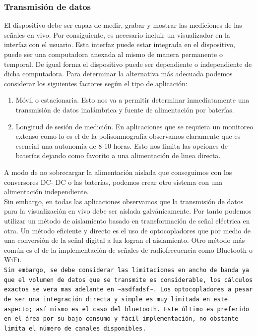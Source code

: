 \subsubsection{Transmisión de datos}
\label{sec:org6bb3188}
El dispositivo debe ser capaz de medir, grabar y mostrar las mediciones de las señales en vivo. Por consiguiente, es necesario incluir un visualizador en la interfaz con el usuario. Esta interfaz puede estar integrada en el dispositivo, puede ser una computadora anexada al mismo de manera permanente o temporal. De igual forma el dispositivo puede ser dependiente o independiente de dicha computadora. Para determinar la alternativa más adecuada podemos considerar los siguientes factores según el tipo de aplicación:\\

\begin{enumerate}
\item Móvil o estacionaria. Esto nos va a permitir determinar inmediatamente una transmisión de datos inalámbrica y fuente de alimentación por baterías.\\
\item Longitud de sesión de medición. En aplicaciones que se requiera un monitoreo extenso como lo es el de la polisomnografía observamos claramente que es esencial una autonomía de 8-10 horas. Esto nos limita las opciones de baterías dejando como favorito a una alimentación de linea directa.\\
\end{enumerate}

A modo de no sobrecargar la alimentación aislada que conseguimos con los conversores DC- DC o las baterías, podemos crear otro sistema con una alimentación independiente.\\

Sin embargo, en todas las aplicaciones observamos que la transmisión de datos para la visualización en vivo debe ser aislada galvánicamente. Por tanto podemos utilizar un método de aislamiento basado en transformación de señal eléctrica en otra. Un método eficiente y directo es el uso de optocopladores que por medio de una conversión de la señal digital a luz logran el aislamiento. Otro método más común es el de la implementación de señales de radiofrecuencia como Bluetooth o WiFi.\\

\texttt{Sin embargo, se debe considerar las limitaciones en ancho de banda ya que el volumen de datos que se transmite es considerable, los cálculos exactos se vera mas adelante en \textasciitilde{}asdfadsf\textasciitilde{}. Los optocopladores a pesar de ser una integración directa y simple es muy limitada en este aspecto; así mismo es el caso del bluetooth. Éste último es preferído en el área por su bajo consumo y fácil implementación, no obstante limita el número de canales disponibles.}\\

